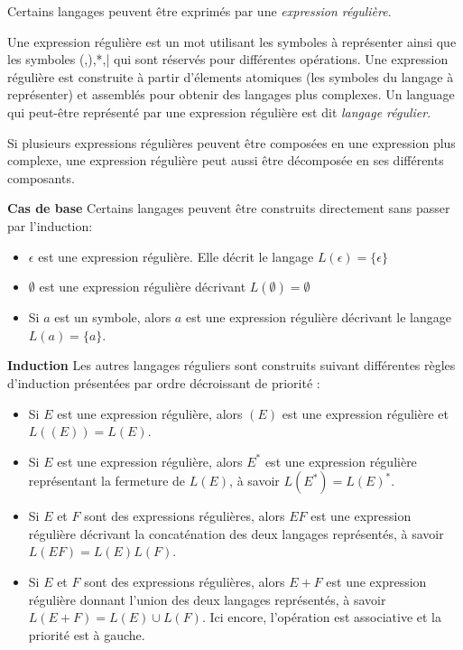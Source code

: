 Certains langages peuvent être exprimés par une \emph{expression régulière}.

Une expression régulière est un mot utilisant les symboles à représenter ainsi que les symboles (,),*,| qui sont réservés pour différentes opérations. Une expression régulière est construite à partir d'élements atomiques (les symboles du langage à représenter) et assemblés pour obtenir des langages plus complexes. Un language qui peut-être représenté par une expression régulière est dit \emph{langage régulier}.

Si plusieurs expressions régulières peuvent être composées en une expression plus complexe, une expression régulière peut aussi être décomposée en ses différents composants.

\textbf{Cas de base}
Certains langages peuvent être construits directement sans passer par l'induction:

\begin{itemize}
	\item $\epsilon$ est une expression régulière. Elle décrit le langage $L(\epsilon)=\{\epsilon\}$
	\item $\emptyset$ est une expression régulière décrivant $L(\emptyset)=\emptyset$
	\item Si $a$ est un symbole, alors $a$ est une expression régulière décrivant le langage $L(a) = \{a\}$.
\end{itemize}


\textbf{Induction}
Les autres langages réguliers sont construits suivant différentes règles d'induction présentées par ordre décroissant de priorité :

\begin{itemize}
	\item Si $E$ est une expression régulière, alors $(E)$ est une expression régulière et $L((E)) = L(E)$.
	\item Si $E$ est une expression régulière, alors $E^*$ est une expression régulière représentant la fermeture de $L(E)$, à savoir $L(E^*) = L(E)^*$.
	\item Si $E$ et $F$ sont des expressions régulières, alors $EF$ est une expression régulière décrivant la concaténation des deux langages représentés, à savoir $L(EF)=L(E)L(F)$.
	\item Si $E$ et $F$ sont des expressions régulières, alors $E+F$ est une expression régulière donnant l'union des deux langages représentés, à savoir $L(E+F)=L(E)\cup L(F)$. Ici encore, l'opération est associative et la priorité est à gauche.
\end{itemize}


